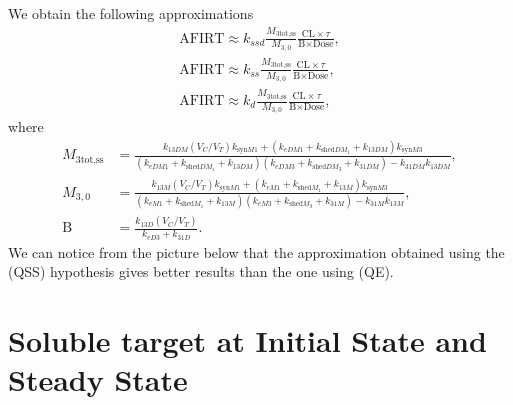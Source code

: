 We obtain the following approximations 
\begin{align*}
\text{AFIRT} \approx k_{ssd}\frac{M_{3\text{tot,ss}}}{M_{3,0}}\frac{\text{CL}\times\tau}{\text{B}\times\text{Dose}},\\
\text{AFIRT} \approx k_{ss}\frac{M_{3\text{tot,ss}}}{M_{3,0}}\frac{\text{CL}\times\tau}{\text{B}\times\text{Dose}},\\
\text{AFIRT} \approx k_{d}\frac{M_{3\text{tot,ss}}}{M_{3,0}}\frac{\text{CL}\times\tau}{\text{B}\times\text{Dose}},
\end{align*}  
where 
\begin{align*}
M_{3\text{tot,ss}}&=\frac{k_{13DM}(V_C/V_T)k_{\text{syn}M1}+(k_{eDM1}+k_{\text{shed}DM_1}+k_{13DM})k_{\text{syn}M3}}{(k_{eDM1}+k_{\text{shed}DM_1}+k_{13DM})(k_{eDM3}+k_{\text{shed}DM_3}+k_{31DM})-k_{31DM}k_{13DM}},\\
M_{3,0}&=\frac{k_{13M}(V_C/V_T)k_{\text{syn}M1}+(k_{eM1}+k_{\text{shed}M_1}+k_{13M})k_{\text{syn}M3}}{(k_{eM1}+k_{\text{shed}M_1}+k_{13M})(k_{eM3}+k_{\text{shed}M_3}+k_{31M})-k_{31M}k_{13M}},\\
\text{B}&=\frac{k_{13D}(V_C/V_T)}{k_{eD3}+k_{31D}}.
\end{align*}
We can notice from the picture below that the approximation obtained using the (QSS) hypothesis gives better results than the one using (QE).

\section{Soluble target at Initial State and Steady State}
